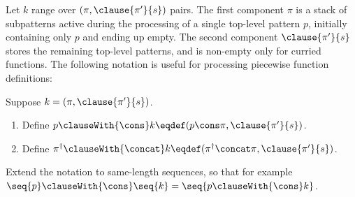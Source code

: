 Let $k$ range over $(\pi, \clause{\pi'}{s})$ pairs. The first component $\pi$ is a stack of subpatterns active
during the processing of a single top-level pattern $p$, initially containing only $p$ and ending up empty.
The second component $\clause{\pi'}{s}$ stores the remaining top-level patterns, and is non-empty only for
curried functions. The following notation is useful for processing piecewise function definitions:

\begin{definition}
   Suppose $k = (\pi, \clause{\pi'}{s})$.
   \begin{enumerate}
      \item Define $p \clauseWith{\cons} k \eqdef (p \cons \pi, \clause{\pi'}{s})$.
      \item Define $\pi^\dagger \clauseWith{\concat} k \eqdef (\pi^\dagger \concat \pi, \clause{\pi'}{s})$.
   \end{enumerate}
   Extend the notation to same-length sequences, so that for example $\seq{p} \clauseWith{\cons} \seq{k} = \seq{p \clauseWith{\cons} k}$.
\end{definition}





